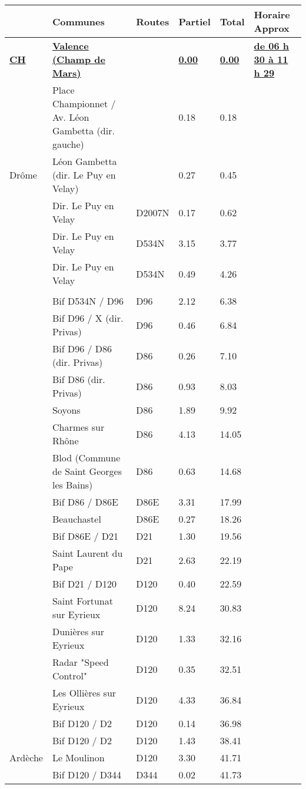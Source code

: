 \documentclass{article}%
\begin{document}
\begin{longtable}{p{2.25cm}|p{6.7cm}|p{2.0cm}|p{1.5cm}|p{1.5cm}|p{3.5cm}}%
\hline%
&Communes&Routes&Partiel&Total&Horaire Approx\\%
\hline%
\endhead%
\endfoot%
\endlastfoot%
\textbf{\underline{﻿CH}}&\textbf{\underline{Valence (Champ de Mars)}}& &\textbf{\underline{0.00}}&\textbf{\underline{0.00}}&\textbf{\underline{de 06 h 30 à 11 h 29}}\\%
 &Place Championnet / Av. Léon Gambetta (dir. gauche)& &0.18&0.18& \\%
Drôme&Léon Gambetta (dir. Le Puy en Velay)& &0.27&0.45& \\%
 &Dir. Le Puy en Velay&D2007N&0.17&0.62& \\%
 &Dir. Le Puy en Velay&D534N&3.15&3.77& \\%
 &Dir. Le Puy en Velay&D534N&0.49&4.26& \\%
\hline& & & & & \\%
 &Bif D534N / D96&D96&2.12&6.38& \\%
 &Bif D96 / X (dir. Privas)&D96&0.46&6.84& \\%
 &Bif D96 / D86 (dir. Privas)&D86&0.26&7.10& \\%
 &Bif D86 (dir. Privas)&D86&0.93&8.03& \\%
 &Soyons&D86&1.89&9.92& \\%
 &Charmes sur Rhône&D86&4.13&14.05& \\%
 &Blod (Commune de Saint Georges les Bains)&D86&0.63&14.68& \\%
 &Bif D86 / D86E&D86E&3.31&17.99& \\%
 &Beauchastel&D86E&0.27&18.26& \\%
 &Bif D86E / D21&D21&1.30&19.56& \\%
 &Saint Laurent du Pape&D21&2.63&22.19& \\%
 &Bif D21 / D120&D120&0.40&22.59& \\%
 &Saint Fortunat sur Eyrieux&D120&8.24&30.83& \\%
 &Dunières sur Eyrieux&D120&1.33&32.16& \\%
 &Radar "Speed Control"&D120&0.35&32.51& \\%
 &Les Ollières sur Eyrieux&D120&4.33&36.84& \\%
 &Bif D120 / D2&D120&0.14&36.98& \\%
 &Bif D120 / D2&D120&1.43&38.41& \\%
Ardèche&Le Moulinon&D120&3.30&41.71& \\%
 &Bif D120 / D344&D344 &0.02&41.73& \\%

\end{longtable}
\end{document}
